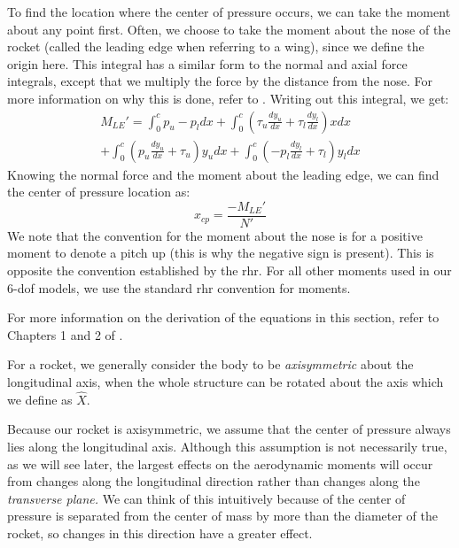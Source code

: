\documentclass[12pt]{report}
\begin{document}
To find the location where the center of pressure occurs, we can take the moment about any point first. Often, we choose to take the moment about the nose of the rocket (called the leading edge when referring to a wing), since we define the origin here. This integral has a similar form to the normal and axial force integrals, except that we multiply the force by the distance from the nose. For more information on why this is done, refer to \cite{gundersen_understanding_2020}. Writing out this integral, we get:
\begin{gather}
    M_{LE}'=\int_0^c{p_u-p_l}{dx}+\int_0^c{\left(\tau_u\frac{dy_u}{dx}+\tau_l\frac{dy_l}{dx}\right)}{xdx}\\+\int_0^c{\left(p_u\frac{dy_u}{dx}+\tau_u\right)}{y_udx}+\int_0^c{\left(-p_l\frac{dy_l}{dx}+\tau_l\right)}{y_ldx}
\end{gather}
Knowing the normal force and the moment about the leading edge, we can find the center of pressure location as:
$$x_{cp}=\frac{-M_{LE}'}{N'}$$
We note that the convention for the moment about the nose is for a positive moment to denote a pitch up (this is why the negative sign is present). This is opposite the convention established by the \gls{rhr}. For all other moments used in our 6-\gls{dof} models, we use the standard \gls{rhr} convention for moments.

For more information on the derivation of the equations in this section, refer to Chapters 1 and 2 of \cite{anderson_fundamentals_2017}.

For a rocket, we generally consider the body to be \textit{axisymmetric} about the longitudinal axis, when the whole structure can be rotated about the axis which we define as $\hat{X}$. 

Because our rocket is axisymmetric, we assume that the center of pressure always lies along the longitudinal axis. Although this assumption is not necessarily true, as we will see later, the largest effects on the aerodynamic moments will occur from changes along the longitudinal direction rather than changes along the \textit{transverse plane. }We can think of this intuitively because of the center of pressure is separated from the center of mass by more than the diameter of the rocket, so changes in this direction have a greater effect.
\end{document}
